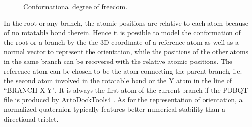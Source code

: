 \begin{figure}
\centering
{}
\caption{Conformational degree of freedom.}
\label{idock:DOF}
\end{figure}

In the root or any branch, the atomic positions are relative to each atom because of no rotatable bond therein. Hence it is possible to model the conformation of the root or a branch by the the 3D coordinate of a reference atom as well as a normal vector to represent the orientation, while the positions of the other atoms in the same branch can be recovered with the relative atomic positions. The reference atom can be chosen to be the atom connecting the parent branch, i.e. the second atom involved in the rotatable bond or the Y atom in the line of ``BRANCH X Y". It is always the first atom of the current branch if the PDBQT file is produced by AutoDockTools4 \citep{596}. As for the representation of orientation, a normalized quaternion typically features better numerical stability than a directional triplet.

